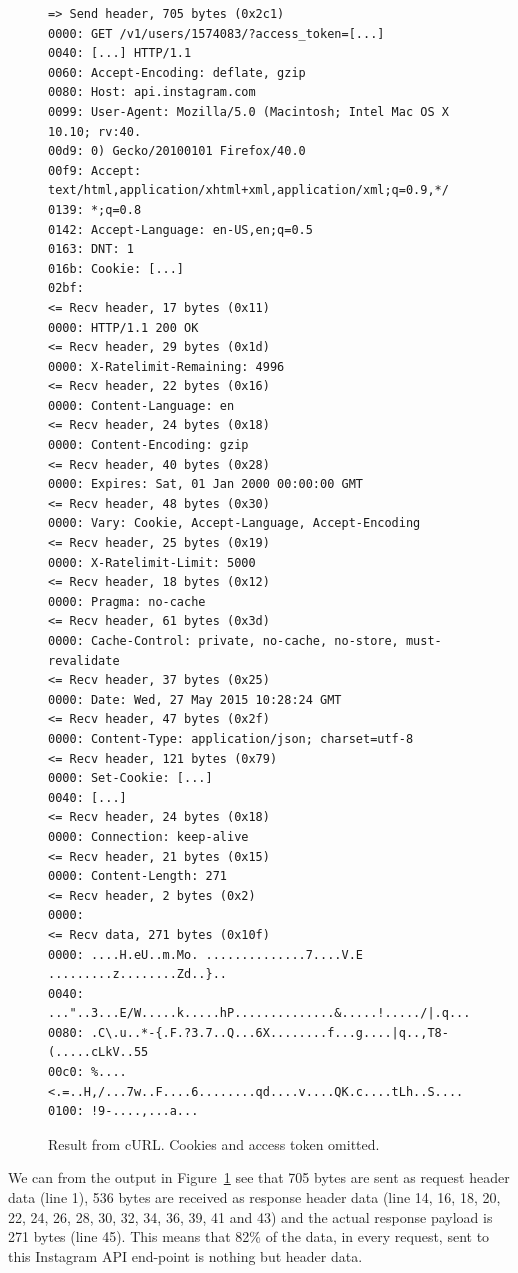\documentclass{cslthse-msc}
\begin{document}
\begin{figure}[H]
  \centering
\begin{lstlisting}[breaklines=true]
=> Send header, 705 bytes (0x2c1)
0000: GET /v1/users/1574083/?access_token=[...]
0040: [...] HTTP/1.1
0060: Accept-Encoding: deflate, gzip
0080: Host: api.instagram.com
0099: User-Agent: Mozilla/5.0 (Macintosh; Intel Mac OS X 10.10; rv:40.
00d9: 0) Gecko/20100101 Firefox/40.0
00f9: Accept: text/html,application/xhtml+xml,application/xml;q=0.9,*/
0139: *;q=0.8
0142: Accept-Language: en-US,en;q=0.5
0163: DNT: 1
016b: Cookie: [...]
02bf:
<= Recv header, 17 bytes (0x11)
0000: HTTP/1.1 200 OK
<= Recv header, 29 bytes (0x1d)
0000: X-Ratelimit-Remaining: 4996
<= Recv header, 22 bytes (0x16)
0000: Content-Language: en
<= Recv header, 24 bytes (0x18)
0000: Content-Encoding: gzip
<= Recv header, 40 bytes (0x28)
0000: Expires: Sat, 01 Jan 2000 00:00:00 GMT
<= Recv header, 48 bytes (0x30)
0000: Vary: Cookie, Accept-Language, Accept-Encoding
<= Recv header, 25 bytes (0x19)
0000: X-Ratelimit-Limit: 5000
<= Recv header, 18 bytes (0x12)
0000: Pragma: no-cache
<= Recv header, 61 bytes (0x3d)
0000: Cache-Control: private, no-cache, no-store, must-revalidate
<= Recv header, 37 bytes (0x25)
0000: Date: Wed, 27 May 2015 10:28:24 GMT
<= Recv header, 47 bytes (0x2f)
0000: Content-Type: application/json; charset=utf-8
<= Recv header, 121 bytes (0x79)
0000: Set-Cookie: [...]
0040: [...]
<= Recv header, 24 bytes (0x18)
0000: Connection: keep-alive
<= Recv header, 21 bytes (0x15)
0000: Content-Length: 271
<= Recv header, 2 bytes (0x2)
0000:
<= Recv data, 271 bytes (0x10f)
0000: ....H.eU..m.Mo. ..............7....V.E .........z........Zd..}..
0040: ..."..3...E/W.....k.....hP..............&.....!...../|.q...]v.~~
0080: .C\.u..*-{.F.?3.7..Q...6X........f...g....|q..,T8-(.....cLkV..55
00c0: %....<.=..H,/...7w..F....6........qd....v....QK.c....tLh..S....
0100: !9-....,...a...
\end{lstlisting}
  \caption{Result from cURL. Cookies and access token omitted.}
  \label{fig:headers_overhead}
\end{figure}

We can from the output in Figure~\ref{fig:headers_overhead} see that 705 bytes are sent as request header data (line 1), 536 bytes are received as response header data (line 14, 16, 18, 20, 22, 24, 26, 28, 30, 32, 34, 36, 39, 41 and 43) and the actual response payload is 271 bytes (line 45). This means that 82\% of the data, in every request, sent to this Instagram API end-point is nothing but header data.
\end{document}

